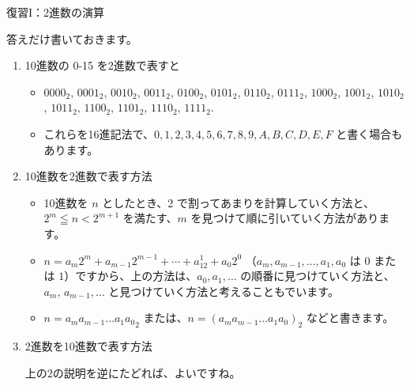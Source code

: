 \documentclass[10pt, dvipdfmx]{beamer}
\begin{document}
\begin{frame}{復習I：2進数の演算}

答えだけ書いておきます。
\begin{enumerate}
\item 10進数の 0-15 を2進数で表すと
\begin{itemize}
    \item \(0000_2\), \(0001_2\), \(0010_2\), \(0011_2\), \(0100_2\), \(0101_2\), \(0110_2\), \(0111_2\), \(1000_2\), \(1001_2\), \(1010_2\), \(1011_2\), \(1100_2\), \(1101_2\), \(1110_2\), \(1111_2\). 
    \item これらを16進記法で、\(0, 1, 2, 3, 4, 5, 6, 7, 8, 9, A, B, C, D, E, F\) と書く場合もあります。
\end{itemize}

\item 10進数を2進数で表す方法
\begin{itemize}
    \item 10進数を \(n\) としたとき、2 で割ってあまりを計算していく方法と、\(2^m \leqq n < 2^{m+1}\) を満たす、\(m\) を見つけて順に引いていく方法があります。
    \item \(n = a_m2^m + a_{m-1}2^{m-1} + \cdots + a_12^1 + a_0 2^0\) （\(a_m, a_{m-1}, \ldots, a_1, a_0\) は \(0\) または \(1\)）ですから、上の方法は、\(a_0, a_1, \ldots\) の順番に見つけていく方法と、\(a_m\), \(a_{m-1}, \ldots\) と見つけていく方法と考えることもでいます。
    \item \(n = {a_ma_{m-1}\ldots a_1a_0}_2\) または、\(n = {(a_ma_{m-1}\ldots a_1a_0)}_2\) などと書きます。
\end{itemize}
\item 2進数を10進数で表す方法\par
上の2の説明を逆にたどれば、よいですね。
\end{enumerate}
\end{frame}
\end{document}
